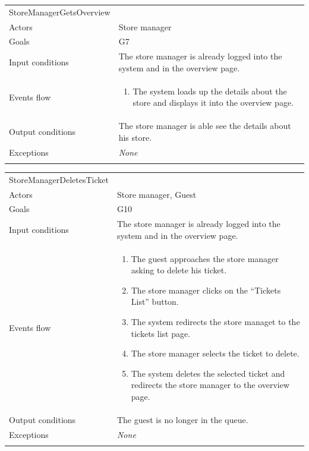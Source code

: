 \clearpage
\begin{longtable}[]{@{}
  >{\raggedright\arraybackslash}p{}
  >{\raggedright\arraybackslash}p{}@{}}
\toprule
StoreManagerGetsOverview & \\ \addlinespace
\midrule
\endhead
Actors & Store manager \\ \addlinespace
Goals & G7 \\ \addlinespace
Input conditions & The store manager is already logged into the system and in the overview page. \\ \addlinespace
Events flow & \begin{enumerate}\vspace{-1.35\baselineskip}
    \item The system loads up the details about the store and displays it into the overview page. 
\vspace{-1.0\baselineskip}\end{enumerate} \\ \addlinespace
Output conditions & The store manager is able see the details about his store. \\ \addlinespace
Exceptions & \emph{None} \\ \addlinespace
\bottomrule
\end{longtable}

\begin{longtable}[]{@{}
  >{\raggedright\arraybackslash}p{}
  >{\raggedright\arraybackslash}p{}@{}}
\toprule
StoreManagerDeletesTicket & \\ \addlinespace
\midrule
\endhead
Actors & Store manager, Guest \\ \addlinespace
Goals & G10 \\ \addlinespace
Input conditions & The store manager is already logged into the system and in the overview page. \\ \addlinespace
Events flow & \begin{enumerate}\vspace{-1.35\baselineskip}
    \item The guest approaches the store manager asking to delete his ticket.
    \item The store manager clicks on the ``Tickets List'' button.
    \item The system redirects the store managet to the tickets list page.
    \item The store manager selects the ticket to delete.
    \item The system deletes the selected ticket and redirects the store manager to the overview page.
\vspace{-1.0\baselineskip}\end{enumerate} \\ \addlinespace
Output conditions & The guest is no longer in the queue. \\ \addlinespace
Exceptions & \emph{None} \\ \addlinespace
\bottomrule
\end{longtable}
\normalsize

